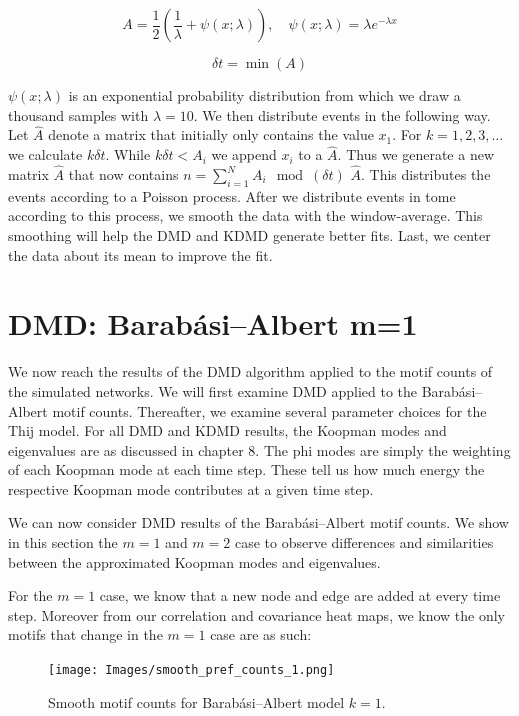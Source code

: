 $$
A = \frac{1}{2} \left( \frac{1}{\lambda} +  \psi(x;\lambda) \right), \quad \psi(x;\lambda) = \lambda e^{-\lambda x}
$$

$$
\delta t = \min(A)
$$

 $\psi(x;\lambda)$ is an exponential probability distribution from which we draw a thousand samples with $\lambda=10$.
  We then distribute events in the following
way. Let ${\hat A}$ denote a matrix that initially only contains the value $x_1$. For $k=1,2,3,\dots$ we calculate $k \delta t$. While $k\delta t < A_i$ we append $x_i$ to 
a ${\hat A}$. Thus we generate a new matrix ${\hat A}$ that now contains $n = \sum^{N}_{i=1} A_i \mod(\delta t)$ 
${\hat A}$. This distributes the events according to a Poisson process. After we distribute events in tome according to this process, we
 smooth the data with the window-average. This smoothing will help the DMD and KDMD generate better fits. Last, we center the data about its mean to improve the fit.

\section{DMD: Barabási–Albert m=1}
We now reach the results of the DMD algorithm applied to the
motif counts of the simulated networks. We will first examine DMD applied to the 
Barabási–Albert motif counts. Thereafter, we examine several parameter choices for the Thij model.
For all DMD and KDMD results, the Koopman modes
 and eigenvalues are as discussed in chapter 8. The phi modes are simply the weighting of each Koopman mode 
 at each time step. These tell us how much energy the respective Koopman mode contributes at a given time
step.

We can now consider DMD results of the Barabási–Albert motif counts. We show in this section
the $m=1$ and $m=2$ case to observe differences and similarities between the approximated 
Koopman modes and eigenvalues. 

For the $m=1$ case, we know that a new node and edge are added at every time step. Moreover from our
correlation and covariance heat maps, we know the only motifs that change in the $m=1$ case 
are as such: 

\newpage

\begin{figure}
    \texttt{[image: Images/smooth\_pref\_counts\_1.png]}
    \centering
    \caption{Smooth motif counts for Barabási–Albert model $k=1$.}
\end{figure}
\clearpage

